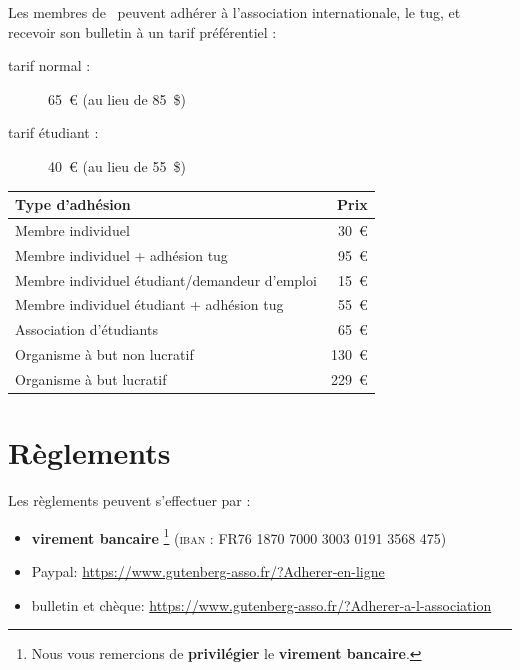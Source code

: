 Les membres de \gut\ peuvent adhérer à l'association
internationale, le \acf{tug}, et recevoir son bulletin
\tugboat{} à un tarif préférentiel :
\begin{description}
\item[tarif normal :] 65~€ (au lieu de 85~\$)
\item[tarif étudiant :] 40~€ (au lieu de 55~\$)
\end{description}

\footnotesize
\begin{center}
  \begin{tabular}{lr}
    \toprule
    \textbf{Type d'adhésion}                        & \textbf{Prix} \\
    \midrule
    Membre individuel                               & 30~€      \\
    Membre individuel + adhésion \acs{tug}          & 95~€      \\
    Membre individuel étudiant/demandeur d'emploi   & 15~€      \\
    Membre individuel étudiant + adhésion \acs{tug} & 55~€      \\
    Association d'étudiants                         & 65~€      \\
    Organisme à but non lucratif                    & 130~€     \\
    Organisme à but lucratif                        & 229~€     \\
    \bottomrule
  \end{tabular}
\end{center}

\section{Règlements}

Les règlements peuvent s'effectuer par :
\begin{itemize}
\item \textbf{virement bancaire}%
  \footnote{Nous vous remercions de \textbf{privilégier}
    le \textbf{virement bancaire}.\label{fn:1}} (\textsc{iban} :
  FR76 1870 7000 3003 0191 3568 475)%
  \leavevmode

\item Paypal\footnotemark[\value{footnote}] :
  \url{https://www.gutenberg-asso.fr/?Adherer-en-ligne}
\item bulletin et chèque\footnotemark[\value{footnote}] :
  \url{https://www.gutenberg-asso.fr/?Adherer-a-l-association}
\end{itemize}

